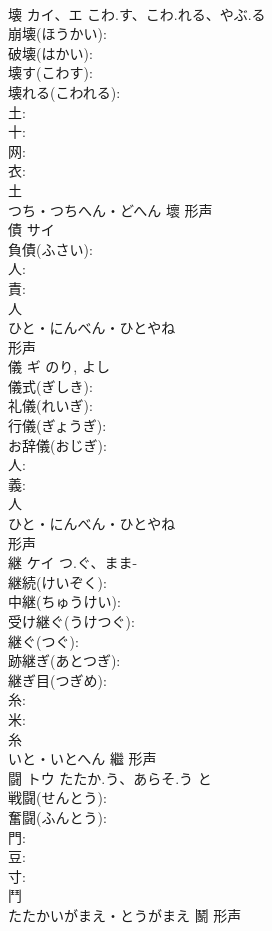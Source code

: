 \documentclass[8pt]{extreport}
\begin{document}
\begin{CJK}{UTF8}{min}
\\	壊	カイ、エ	こわ.す、こわ.れる、やぶ.る		
\\	崩壊(ほうかい): 
\\	破壊(はかい): 
\\	壊す(こわす): 
\\	壊れる(こわれる): 
\\	土: 
\\	十: 
\\	网: 
\\	衣: 
\\	土	
\\	つち・つちへん・どへん	壞	形声 
\\	債	サイ			
\\	負債(ふさい): 
\\	人: 
\\	責: 
\\	人	
\\	ひと・にんべん・ひとやね	
\\	形声 
\\	儀	ギ		のり, よし	
\\	儀式(ぎしき): 
\\	礼儀(れいぎ): 
\\	行儀(ぎょうぎ): 
\\	お辞儀(おじぎ): 
\\	人: 
\\	義: 
\\	人	
\\	ひと・にんべん・ひとやね	
\\	形声 
\\	継	ケイ	つ.ぐ、まま-		
\\	継続(けいぞく): 
\\	中継(ちゅうけい): 
\\	受け継ぐ(うけつぐ): 
\\	継ぐ(つぐ): 
\\	跡継ぎ(あとつぎ): 
\\	継ぎ目(つぎめ): 
\\	糸: 
\\	米: 
\\	糸	
\\	いと・いとへん	繼	形声 
\\	闘	トウ	たたか.う、あらそ.う	と	
\\	戦闘(せんとう): 
\\	奮闘(ふんとう): 
\\	門: 
\\	豆: 
\\	寸: 
\\	鬥	
\\	たたかいがまえ・とうがまえ	鬭	形声 

\end{CJK}
\end{document}
